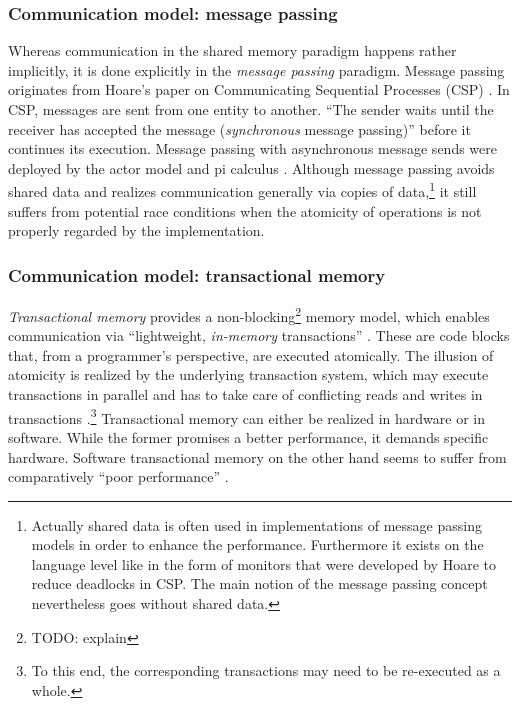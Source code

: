 \subsubsection{Communication model: message passing}
Whereas communication in the shared memory paradigm happens rather implicitly, it is done explicitly in the \textit{message passing} paradigm. Message passing originates from Hoare's paper on Communicating Sequential Processes (CSP) \cite{CommunicatingSequentialProcesses}. In CSP, messages are sent from one entity to another. ``The sender waits until the receiver has accepted the message (\textit{synchronous} message passing)'' \cite[p.~138]{DistributedSharedMemory} before it continues its execution. Message passing with asynchronous message sends were deployed by the actor model \cite{UniversalModularACTORFormalism} and pi calculus \cite{ThePolyadicPi-Calculus}. Although message passing avoids shared data and realizes communication generally via copies of data,\footnote{Actually shared data is often used in implementations of message passing models in order to enhance the performance. Furthermore it exists on the language level like in the form of monitors that were developed by Hoare to reduce deadlocks in CSP. The main notion of the message passing concept nevertheless goes without shared data.} it still suffers from potential race conditions \cite{DebuggingRaceConditions} when the atomicity of operations is not properly regarded by the implementation.

\subsubsection{Communication model: transactional memory}
\textit{Transactional memory} provides a non-blocking\footnote{TODO: explain} memory model, which enables communication via ``lightweight, \textit{in-memory} transactions'' \cite[p.~3]{PrinciplesOfTransactionalMemory}. These are code blocks that, from a programmer's perspective, are executed atomically. The illusion of atomicity is realized by the underlying transaction system, which may execute transactions in parallel and has to take care of conflicting reads and writes in transactions \cite{TransactionalMemory}.\footnote{To this end, the corresponding transactions may need to be re-executed as a whole.} Transactional memory can either be realized in hardware or in software. While the former promises a better performance, it demands specific hardware. Software transactional memory on the other hand seems to suffer from comparatively ``poor performance'' \cite[p.~13]{TransactionalProgrammabilityAndPerformance}.

